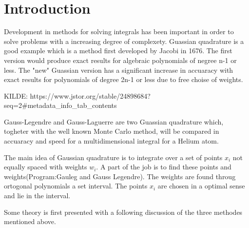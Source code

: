 \documentclass[../main.tex]{subfiles}
\begin{document}
\section{Introduction} \label{sec:intro}
Development in methods for solving integrals has been important in order to solve problems with a increasing degree of complexety. Guassian quadrature is a good example which is a method first developed by Jacobi in 1676. The first version would produce exact results for algebraic polynomials of negree n-1 or less. The "new" Guassian version has a significant increase in accuaracy with exact results for polynomials of degree 2n-1 or less due to free choise of weights.


KILDE:
https://www.jstor.org/stable/24898684?seq=2#metadata_info_tab_contents


Gauss-Legendre and Gauss-Laguerre are two Guassian quadrature which, togheter with the well known Monte Carlo method, will be compared in accuaracy and speed for a multidimensional integral for a Helium atom.

The main idea of Gaussian quadrature is to integrate over a set of points $x_i$ not equally spaced with weights $w_i$. A part of the job is to find these points and weights(Program:Gauleg and Gauss Legendre). The weights are found throug ortogonal polynomials a set interval. The points $x_i$ are chosen in a optimal sense and lie in the interval.

Some theory is first presented with a following discussion of the three methodes mentioned above.
\end{document}
